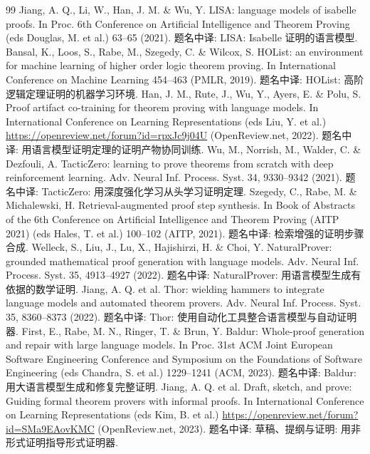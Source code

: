\begin{thebibliography}{99}
 Jiang, A. Q., Li, W., Han, J. M. \& Wu, Y. LISA: language models of isabelle proofs. In Proc. 6th Conference on Artificial Intelligence and Theorem Proving (eds Douglas, M. et al.) 63--65 (2021). 题名中译: LISA: Isabelle 证明的语言模型.
 Bansal, K., Loos, S., Rabe, M., Szegedy, C. \& Wilcox, S. HOList: an environment for machine learning of higher order logic theorem proving. In International Conference on Machine Learning 454--463 (PMLR, 2019). 题名中译: HOList: 高阶逻辑定理证明的机器学习环境.
 Han, J. M., Rute, J., Wu, Y., Ayers, E. \& Polu, S. Proof artifact co-training for theorem proving with language models. In International Conference on Learning Representations (eds Liu, Y. et al.) \url{https://openreview.net/forum?id=rpxJc9j04U} (OpenReview.net, 2022). 题名中译: 用语言模型证明定理的证明产物协同训练.
 Wu, M., Norrish, M., Walder, C. \& Dezfouli, A. TacticZero: learning to prove theorems from scratch with deep reinforcement learning. Adv. Neural Inf. Process. Syst. 34, 9330--9342 (2021). 题名中译: TacticZero: 用深度强化学习从头学习证明定理.
 Szegedy, C., Rabe, M. \& Michalewski, H. Retrieval-augmented proof step synthesis. In Book of Abstracts of the 6th Conference on Artificial Intelligence and Theorem Proving (AITP 2021) (eds Hales, T. et al.) 100--102 (AITP, 2021). 题名中译: 检索增强的证明步骤合成.
 Welleck, S., Liu, J., Lu, X., Hajishirzi, H. \& Choi, Y. NaturalProver: grounded mathematical proof generation with language models. Adv. Neural Inf. Process. Syst. 35, 4913--4927 (2022). 题名中译: NaturalProver: 用语言模型生成有依据的数学证明.
 Jiang, A. Q. et al. Thor: wielding hammers to integrate language models and automated theorem provers. Adv. Neural Inf. Process. Syst. 35, 8360--8373 (2022). 题名中译: Thor: 使用自动化工具整合语言模型与自动证明器.
 First, E., Rabe, M. N., Ringer, T. \& Brun, Y. Baldur: Whole-proof generation and repair with large language models. In Proc. 31st ACM Joint European Software Engineering Conference and Symposium on the Foundations of Software Engineering (eds Chandra, S. et al.) 1229--1241 (ACM, 2023). 题名中译: Baldur: 用大语言模型生成和修复完整证明.
 Jiang, A. Q. et al. Draft, sketch, and prove: Guiding formal theorem provers with informal proofs. In International Conference on Learning Representations (eds Kim, B. et al.) \url{https://openreview.net/forum?id=SMa9EAovKMC} (OpenReview.net, 2023). 题名中译: 草稿、提纲与证明: 用非形式证明指导形式证明器.

\end{thebibliography}
